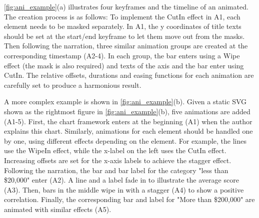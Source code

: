 \autoref{fig:ani_example}(a) illustrates four keyframes and the timeline of an animated.
The creation process is as follows:
To implement the CutIn effect in A1, each element needs to be masked separately.
In A1, the y coordinates of title texts should be set at the start/end keyframe to let them move out from the masks.
Then following the narration, three similar animation groups are created at the corresponding timestamp (A2-4).
In each group, the bar enters using a Wipe effect (the mask is also required) and texts of the axis and the bar enter using CutIn.
The relative offsets, durations and easing functions for each animation are carefully set to produce a harmonious result.

A more complex example is shown in \autoref{fig:ani_example}(b). 
Given a static SVG shown as the rightmost figure in \autoref{fig:ani_example}(b), five animations are added (A1-5).
First, the chart framework enters at the beginning (A1) when the author explains this chart.
Similarly, animations for each element should be handled one by one, using different effects depending on the element. 
For example, the lines use the WipeIn effect, while the x-label on the left uses the CutIn effect. Increasing offsets are set for the x-axis labels to achieve the stagger effect.
Following the narration, the bar and bar label for the category "less than \$20,000" enter (A2).
A line and a label fade in to illustrate the average score (A3).
Then, bars in the middle wipe in with a stagger (A4) to show a positive correlation.
Finally, the corresponding bar and label for "More than \$200,000" are animated with similar effects (A5).


